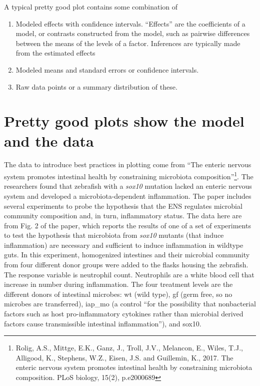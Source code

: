 \documentclass[]{book}
\providecommand{\tightlist}{%
  \setlength{\itemsep}{0pt}\setlength{\parskip}{0pt}}
\let\rmarkdownfootnote\footnote%
\def\footnote{\protect\rmarkdownfootnote}
\begin{document}
A typical pretty good plot contains some combination of

\begin{enumerate}
\def\labelenumi{\arabic{enumi}.}
\tightlist
\item
  Modeled effects with confidence intervals. ``Effects'' are the coefficients of a model, or contrasts constructed from the model, such as pairwise differences between the means of the levels of a factor. Inferences are typically made from the estimated effects
\item
  Modeled means and standard errors or confidence intervals.
\item
  Raw data points or a summary distribution of these.
\end{enumerate}

\hypertarget{pretty-good-plots-show-the-model-and-the-data}{%
\section{Pretty good plots show the model and the data}\label{pretty-good-plots-show-the-model-and-the-data}}

The data to introduce best practices in plotting come from ``The enteric nervous system promotes intestinal health by constraining microbiota composition''\footnote{Rolig, A.S., Mittge, E.K., Ganz, J., Troll, J.V., Melancon, E., Wiles, T.J., Alligood, K., Stephens, W.Z., Eisen, J.S. and Guillemin, K., 2017. The enteric nervous system promotes intestinal health by constraining microbiota composition. PLoS biology, 15(2), p.e2000689}. The researchers found that zebrafish with a \emph{sox10} mutation lacked an enteric nervous system and developed a microbiota-dependent inflammation. The paper includes several experiments to probe the hypothesis that the ENS regulates microbial community composition and, in turn, inflammatory status. The data here are from Fig. 2 of the paper, which reports the results of one of a set of experiments to test the hypothesis that microbiota from \emph{sox10} mutants (that induce inflammation) are necessary and sufficient to induce inflammation in wildtype guts. In this experiment, homogenized intestines and their microbial community from four different donor groups were added to the flasks housing the zebrafish. The response variable is neutrophil count. Neutrophils are a white blood cell that increase in number during inflammation. The four treatment levels are the different donors of intestinal microbes: wt (wild type), gf (germ free, so no microbes are transferred), iap\_mo (a control ``for the possibility that nonbacterial factors such as host pro-inflammatory cytokines rather than microbial derived factors cause transmissible intestinal inflammation''), and sox10.
\end{document}
